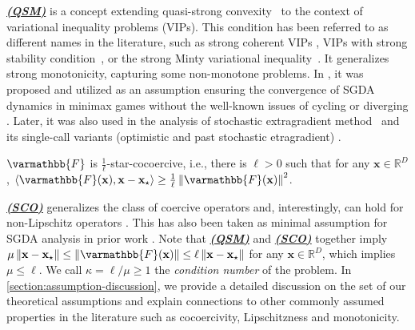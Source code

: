 \documentclass{article}
\newcommand{\vx}{{\mathbf{x}}}
\newcommand{\reals}{\mathbb{R}}
\newcommand{\opF}{{\varmathbb{F}}}
\newcommand{\inprod}[2]{\left\langle #1,#2 \right\rangle}
\newcommand{\sqnorm}[1]{\left\| #1 \right\|^2}
\newcommand{\norm}[1]{\left\|#1\right\|}
\theoremstyle{plain}
\theoremstyle{remark}
\begin{document}
\hyperref[assumption:quasi-strong-monotonicity]{\textbf{\emph{(QSM)}}} is a concept extending quasi-strong convexity~\citep{gower2019sgd,GowerSebbouhLoizou2021_sgd} to the context of variational inequality problems (VIPs). 
This condition has been referred to as different names in the literature, such as strong coherent VIPs \citep{song2020optimistic}, VIPs with strong stability condition~\citep{mertikopoulos2019learning}, or the strong Minty variational inequality~\citep{diakonikolas2021efficient}. 
It generalizes strong monotonicity, capturing some non-monotone problems.
In 
\citep{LoizouBerardGidelMitliagkasLacoste-Julien2021_stochastic}, it was proposed and utilized as an assumption ensuring the convergence of SGDA dynamics in minimax games without the well-known issues of cycling or diverging \citep{MeschederNowozinGeiger2017_numerics, DaskalakisIlyasSyrgkanisZeng2018_training}. 
Later, it was also used in the analysis of stochastic extragradient method~\citep{gorbunov2022stochastic} and its single-call variants (optimistic and past stochastic etragradient) \citep{choudhury2024single}.

\begin{assumption}
\label{assumption:star-cocoercivity}
$\opF$ is $\frac{1}{\ell}$-star-cocoercive, i.e., there is $\ell>0$ such that for any $\vx \in \reals^D$, $\inprod{\opF(\vx)}{\vx - \vx_\star} \ge \frac{1}{\ell} \sqnorm{\opF(\vx)}$.    
\end{assumption}

\hyperref[assumption:star-cocoercivity]{\textbf{\emph{(SCO)}}} generalizes the class of coercive operators and, interestingly, can hold for non-Lipschitz operators \citep{LoizouBerardGidelMitliagkasLacoste-Julien2021_stochastic}.
This has also been taken as minimal assumption for SGDA analysis in prior work \citep{BeznosikovGorbunovBerardLoizou2023_stochastic}. Note that \hyperref[assumption:quasi-strong-monotonicity]{\textbf{\emph{(QSM)}}} and \hyperref[assumption:star-cocoercivity]{\textbf{\emph{(SCO)}}} together imply $\mu \norm{\vx - \vx_\star} \le \norm{\opF(\vx)} \le \ell \norm{\vx - \vx_\star}$ 
for any $\vx \in \reals^D$, which implies $\mu \le \ell$.
We call $\kappa = \ell/\mu \ge 1$ the \emph{condition number} of the problem. 
In \cref{section:assumption-discussion}, we provide a detailed discussion on the set of our theoretical assumptions and explain connections to other commonly assumed properties in the literature such as cocoercivity, Lipschitzness and monotonicity.
\end{document}
